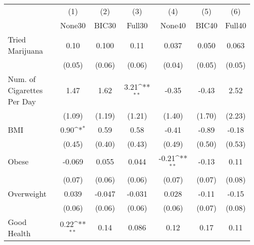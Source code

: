 {
\def\sym#1{\ifmmode^{#1}\else\(^{#1}\)\fi}
\begin{tabular}{l*{6}{c}}
\toprule
            &\multicolumn{1}{c}{(1)}&\multicolumn{1}{c}{(2)}&\multicolumn{1}{c}{(3)}&\multicolumn{1}{c}{(4)}&\multicolumn{1}{c}{(5)}&\multicolumn{1}{c}{(6)}\\
            &\multicolumn{1}{c}{None30}&\multicolumn{1}{c}{BIC30}&\multicolumn{1}{c}{Full30}&\multicolumn{1}{c}{None40}&\multicolumn{1}{c}{BIC40}&\multicolumn{1}{c}{Full40}\\
\midrule
Tried Marijuana&        0.10         &       0.100         &        0.11         &       0.037         &       0.050         &       0.063         \\
            &      (0.05)         &      (0.06)         &      (0.06)         &      (0.04)         &      (0.05)         &      (0.05)         \\
\addlinespace
Num. of Cigarettes Per Day&        1.47         &        1.62         &        3.21\sym{**} &       -0.35         &       -0.43         &        2.52         \\
            &      (1.09)         &      (1.19)         &      (1.21)         &      (1.40)         &      (1.70)         &      (2.23)         \\
\addlinespace
BMI         &        0.90\sym{*}  &        0.59         &        0.58         &       -0.41         &       -0.89         &       -0.18         \\
            &      (0.45)         &      (0.40)         &      (0.43)         &      (0.49)         &      (0.50)         &      (0.53)         \\
\addlinespace
Obese       &      -0.069         &       0.055         &       0.044         &       -0.21\sym{**} &       -0.13         &        0.11         \\
            &      (0.07)         &      (0.06)         &      (0.06)         &      (0.07)         &      (0.07)         &      (0.08)         \\
\addlinespace
Overweight  &       0.039         &      -0.047         &      -0.031         &       0.028         &       -0.11         &       -0.15         \\
            &      (0.06)         &      (0.06)         &      (0.06)         &      (0.06)         &      (0.07)         &      (0.08)         \\
\addlinespace
Good Health &        0.22\sym{**} &        0.14         &       0.086         &        0.12         &        0.17         &        0.11         \\

\end{tabular}}
